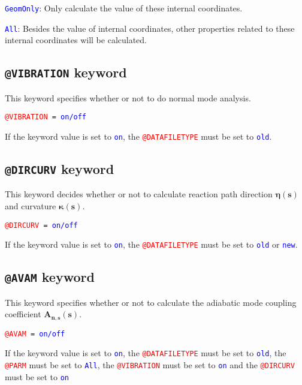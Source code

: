 \textcolor{blue}{\texttt{GeomOnly}}: Only calculate the value of these internal coordinates. 


\textcolor{blue}{\texttt{All}}: Besides the value of internal coordinates, other properties related to these internal coordinates will be calculated.



\subsection{\texttt{@VIBRATION} keyword }
This keyword specifies whether or not to do normal mode analysis.

\texttt{\textcolor{red}{@VIBRATION} = \textcolor{blue}{on/off}  }

If the keyword value is set to \texttt{\textcolor{blue}{on}}, the \texttt{\textcolor{red}{@DATAFILETYPE}} must be set to \texttt{\textcolor{blue}{old}}.


\subsection{\texttt{@DIRCURV} keyword}
This keyword decides whether or not to calculate reaction path direction $\boldsymbol {\eta(s)}$ and curvature $\boldsymbol {\kappa(s)}$.

\texttt{\textcolor{red}{@DIRCURV} = \textcolor{blue}{on/off}  }

If the keyword value is set to  \texttt{\textcolor{blue}{on}}, the \texttt{\textcolor{red}{@DATAFILETYPE}} must be set to \texttt{\textcolor{blue}{old}} or \texttt{\textcolor{blue}{new}}. 




\subsection{\texttt{@AVAM} keyword}
This keyword specifies whether or not to calculate the adiabatic mode coupling coefficient $\boldsymbol{ A_{n,s}(s)}$.


\texttt{\textcolor{red}{@AVAM} = \textcolor{blue}{on/off}  }

If the keyword value is set to \texttt{\textcolor{blue}{on}}, the \texttt{\textcolor{red}{@DATAFILETYPE}} must be set to \texttt{\textcolor{blue}{old}}, 
the \texttt{\textcolor{red}{@PARM}} must be set to \texttt{\textcolor{blue}{All}},
the \texttt{\textcolor{red}{@VIBRATION}} must be set to \texttt{\textcolor{blue}{on}} and the \texttt{\textcolor{red}{@DIRCURV}} must be set to \texttt{\textcolor{blue}{on}}




